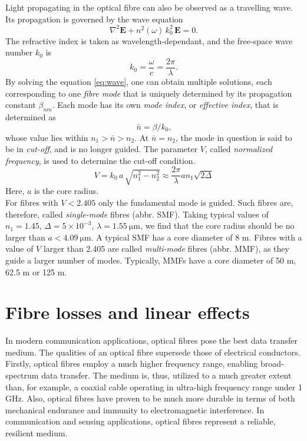 \documentclass{standalone}
\begin{document}
Light propagating in the optical fibre can also be observed as a travelling wave. Its propagation is governed by the wave equation
\begin{equation} \label{eq:wave}
\nabla^2 \mathbf{E} + n^2(\omega) \, k_0^2 \, \mathbf{E} = 0 \textrm{.}
\end{equation}
The refractive index is taken as wavelength-dependant, and the free-space wave number $k_0$ is
\begin{equation}
k_0 = \frac{\omega}{c} = \frac{2 \pi}{\lambda} \textrm{.}
\end{equation}
By solving the equation \ref{eq:wave}, one can obtain multiple solutions, each corresponding to one \textit{fibre mode} that is uniquely determined by its propagation constant $\beta_{nm}$. Each mode has its own \textit{mode index}, or \textit{effective index}, that is determined as
\begin{equation}
\bar{n} = \beta/k_0 \textrm{,}
\end{equation}
whose value lies within $n_1 > \bar{n} > n_2$. At $\bar{n} = n_2$, the mode in question is said to be in \textit{cut-off}, and is no longer guided. The parameter $V$, called \textit{normalized frequency}, is used to determine the cut-off condition.
\begin{equation}
V = k_0 \, a \, \sqrt{n_1^2 - n_2^2} \approx \frac{2 \pi}{\lambda} a n_1 \sqrt{2 \varDelta}
\end{equation}
Here, $a$ is the core radius. \\

For fibres with $V < 2.405$ only the fundamental mode is guided. Such fibres are, therefore, called \textit{single-mode} fibres (abbr. SMF). Taking typical values of $n_1 = 1.45$, $\varDelta = 5 \times 10^{-3}$, $\lambda = \SI{1.55}{\micro \meter}$, we find that the core radius should be no larger than $a < \SI{4.09}{\micro \meter}$. A typical SMF has a core diameter of 8 \textmu m. Fibres with a value of $V$ larger than 2.405 are called \textit{multi-mode} fibres (abbr. MMF), as they guide a larger number of modes. Typically, MMFs have a core diameter of 50 \textmu m, 62.5 \textmu m or 125 \textmu m.


\section{Fibre losses and linear effects}

In modern communication applications, optical fibres pose the best data transfer medium. The qualities of an optical fibre supersede those of electrical conductors. Firstly, optical fibres employ a much higher frequency range, enabling broad-spectrum data transfer. The medium is, thus, utilized to a much greater extent than, for example, a coaxial cable operating in ultra-high frequency range under 1 GHz. Also, optical fibres have proven to be much more durable in terms of both mechanical endurance and immunity to electromagnetic interference. In communication and sensing applications, optical fibres represent a reliable, resilient medium. \\
\end{document}
